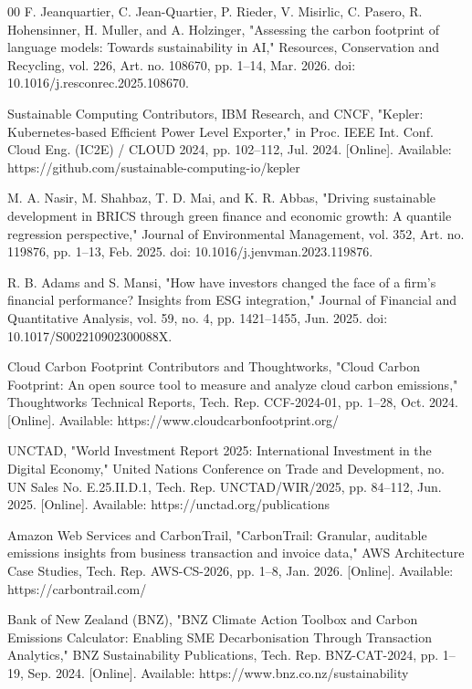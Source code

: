 \documentclass[conference]{IEEEtran}
\begin{document}
\begin{thebibliography}{00}
F. Jeanquartier, C. Jean-Quartier, P. Rieder, V. Misirlic, C. Pasero, R. Hohensinner, H. Muller, and A. Holzinger, "Assessing the carbon footprint of language models: Towards sustainability in AI," Resources, Conservation and Recycling, vol. 226, Art. no. 108670, pp. 1–14, Mar. 2026. doi: 10.1016/j.resconrec.2025.108670.

Sustainable Computing Contributors, IBM Research, and CNCF, "Kepler: Kubernetes-based Efficient Power Level Exporter," in Proc. IEEE Int. Conf. Cloud Eng. (IC2E) / CLOUD 2024, pp. 102–112, Jul. 2024. [Online]. Available: https://github.com/sustainable-computing-io/kepler

M. A. Nasir, M. Shahbaz, T. D. Mai, and K. R. Abbas, "Driving sustainable development in BRICS through green finance and economic growth: A quantile regression perspective," Journal of Environmental Management, vol. 352, Art. no. 119876, pp. 1–13, Feb. 2025. doi: 10.1016/j.jenvman.2023.119876.

R. B. Adams and S. Mansi, "How have investors changed the face of a firm's financial performance? Insights from ESG integration," Journal of Financial and Quantitative Analysis, vol. 59, no. 4, pp. 1421–1455, Jun. 2025. doi: 10.1017/S002210902300088X.

Cloud Carbon Footprint Contributors and Thoughtworks, "Cloud Carbon Footprint: An open source tool to measure and analyze cloud carbon emissions," Thoughtworks Technical Reports, Tech. Rep. CCF-2024-01, pp. 1–28, Oct. 2024. [Online]. Available: https://www.cloudcarbonfootprint.org/

UNCTAD, "World Investment Report 2025: International Investment in the Digital Economy," United Nations Conference on Trade and Development, no. UN Sales No. E.25.II.D.1, Tech. Rep. UNCTAD/WIR/2025, pp. 84–112, Jun. 2025. [Online]. Available: https://unctad.org/publications

Amazon Web Services and CarbonTrail, "CarbonTrail: Granular, auditable emissions insights from business transaction and invoice data," AWS Architecture Case Studies, Tech. Rep. AWS-CS-2026, pp. 1–8, Jan. 2026. [Online]. Available: https://carbontrail.com/

Bank of New Zealand (BNZ), "BNZ Climate Action Toolbox and Carbon Emissions Calculator: Enabling SME Decarbonisation Through Transaction Analytics," BNZ Sustainability Publications, Tech. Rep. BNZ-CAT-2024, pp. 1–19, Sep. 2024. [Online]. Available: https://www.bnz.co.nz/sustainability


\end{thebibliography}
\end{document}
